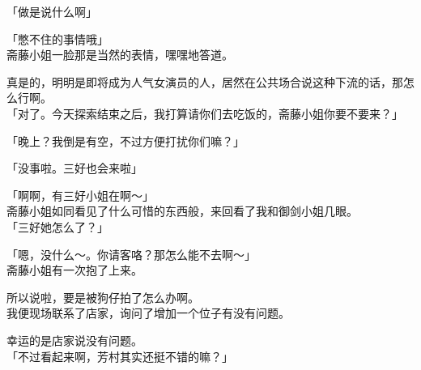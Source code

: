 「做是说什么啊」

「憋不住的事情哦」\\

斋藤小姐一脸那是当然的表情，嘿嘿地答道。

真是的，明明是即将成为人气女演员的人，居然在公共场合说这种下流的话，那怎么行啊。\\

「对了。今天探索结束之后，我打算请你们去吃饭的，斋藤小姐你要不要来？」

「晚上？我倒是有空，不过方便打扰你们嘛？」

「没事啦。三好也会来啦」

「啊啊，有三好小姐在啊～」\\

斋藤小姐如同看见了什么可惜的东西般，来回看了我和御剑小姐几眼。\\

「三好她怎么了？」

「嗯，没什么～。你请客咯？那怎么能不去啊～」\\

斋藤小姐有一次抱了上来。

所以说啦，要是被狗仔拍了怎么办啊。\\

我便现场联系了店家，询问了增加一个位子有没有问题。

幸运的是店家说没有问题。\\

「不过看起来啊，芳村其实还挺不错的嘛？」

